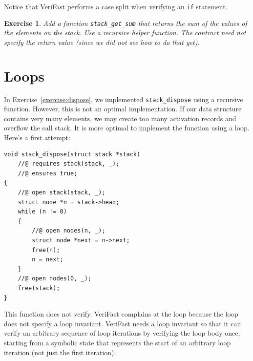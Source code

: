 \documentclass{article}
\newtheorem{exercise}{Exercise}
\begin{document}
Notice that VeriFast performs a case split when verifying an
\lstinline!if! statement.

\begin{exercise}\label{exercise:sum}
Add a function \lstinline!stack_get_sum! that returns the sum
of the values of the elements on the stack. Use a recursive
helper function. The contract need not specify the return value
(since we did not see how to do that yet).
\end{exercise}

\section{Loops}\label{section:loops}

In Exercise~\ref{exercise:dispose}, we implemented
\lstinline!stack_dispose! using a recursive function. However,
this is not an optimal implementation. If our data structure
contains very many elements, we may create too many activation
records and overflow the call stack. It is more optimal to
implement the function using a loop. Here's a first attempt:
\begin{lstlisting}
void stack_dispose(struct stack *stack)
    //@ requires stack(stack, _);
    //@ ensures true;
{
    //@ open stack(stack, _);
    struct node *n = stack->head;
    while (n != 0)
    {
        //@ open nodes(n, _);
        struct node *next = n->next;
        free(n);
        n = next;
    }
    //@ open nodes(0, _);
    free(stack);
}
\end{lstlisting}
This function does not verify. VeriFast complains at the loop
because the loop does not specify a loop invariant. VeriFast
needs a loop invariant so that it can verify an arbitrary
sequence of loop iterations by verifying the loop body once,
starting from a symbolic state that represents the start of an
arbitrary loop iteration (not just the first iteration).
\end{document}
